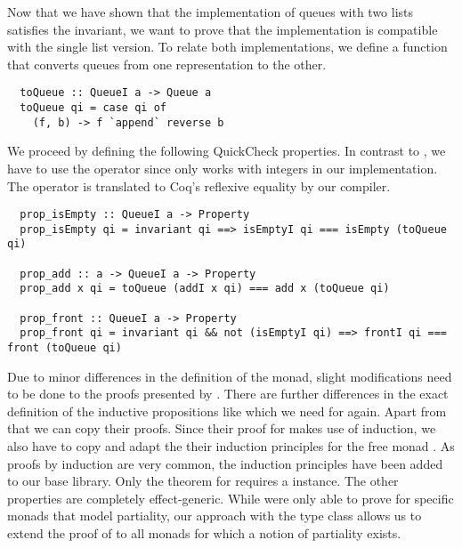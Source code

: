 Now that we have shown that the implementation of queues with two lists satisfies the invariant, we want to prove that the implementation is compatible with the single list version.
To relate both implementations, we define a function that converts queues from one representation to the other.
\begin{verbatim}
  toQueue :: QueueI a -> Queue a
  toQueue qi = case qi of
    (f, b) -> f `append` reverse b
\end{verbatim}
We proceed by defining the following QuickCheck properties.
In contrast to \cite{Dylus:2018}, we have to use the \haskell{(===)} operator since \haskell{(==)} only works with integers in our implementation.
The \haskell{(===)} operator is translated to Coq's reflexive equality by our compiler.
\begin{verbatim}
  prop_isEmpty :: QueueI a -> Property
  prop_isEmpty qi = invariant qi ==> isEmptyI qi === isEmpty (toQueue qi)

  prop_add :: a -> QueueI a -> Property
  prop_add x qi = toQueue (addI x qi) === add x (toQueue qi)

  prop_front :: QueueI a -> Property
  prop_front qi = invariant qi && not (isEmptyI qi) ==> frontI qi === front (toQueue qi)
\end{verbatim}
Due to minor differences in the definition of the  monad, slight modifications need to be done to the proofs presented by \cite{Dylus:2018}.
There are further differences in the exact definition of the inductive propositions like  which we need for  again.
Apart from that we can copy their proofs.
Since their proof for  makes use of induction, we also have to copy and adapt the their induction principles for the free monad \cite[pp.~29-31]{Dylus:2018}.
As proofs by induction are very common, the induction principles have been added to our base library.
Only the theorem for  requires a  instance.
The other properties are completely effect-generic.
While \cite{Dylus:2018} were only able to prove  for specific monads that model partiality, our approach with the  type class allows us to extend the proof of  to all monads for which a notion of partiality exists.
